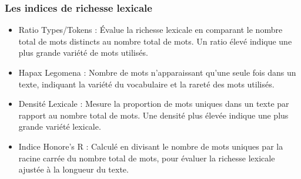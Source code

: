 \documentclass[12pt,a4paper,oneside,titlepage]{article} %
\begin{document}
	\subsubsection{Les indices de richesse lexicale}
	\begin{itemize}
		
	\item Ratio Types/Tokens : Évalue la richesse lexicale en comparant le nombre total de mots distincts au nombre total de mots. Un ratio élevé indique une plus grande variété de mots utilisés.

\item Hapax Legomena : Nombre de mots n'apparaissant qu'une seule fois dans un texte, indiquant la variété du vocabulaire et la rareté des mots utilisés.

 \item Densité Lexicale : Mesure la proportion de mots uniques dans un texte par rapport au nombre total de mots. Une densité plus élevée indique une plus grande variété lexicale.

 \item Indice Honore's R : Calculé en divisant le nombre de mots uniques par la racine carrée du nombre total de mots, pour évaluer la richesse lexicale ajustée à la longueur du texte.
	\end{itemize}

			\pagebreak
			\nocite{*}
	\printbibliography
\end{document}
